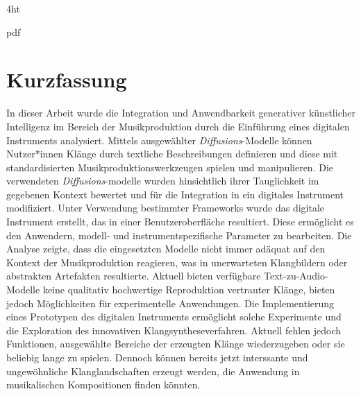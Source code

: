 \documentclass[
  a4paper,  %
  twoside,  %
  bibliography=totoc,
  headsepline,
  cleardoublepage=empty,
  parskip=half,
  draft=false
]{scrbook}
\begin{document}
\iftex4ht
  \Configure{$}{\PicMath}{\EndPicMath}{}

  {pdf}
  {%
  }
\fi



\Coverpage
\Copyright
\pagestyle{preamble}
\renewcommand*{\chapterpagestyle}{preamble}



\section*{Kurzfassung}

In dieser Arbeit wurde die Integration und Anwendbarkeit generativer künstlicher Intelligenz im Bereich der Musikproduktion durch die Einführung eines digitalen Instruments analysiert. Mittels ausgewählter \emph{Diffusions}-Modelle können Nutzer*innen Klänge durch textliche Beschreibungen definieren und diese mit standardisierten Musikproduktionswerkzeugen spielen und manipulieren. Die verwendeten \emph{Diffusions}-modelle wurden hinsichtlich ihrer Tauglichkeit im gegebenen Kontext bewertet und für die Integration in ein digitales Instrument modifiziert. Unter Verwendung bestimmter Frameworks wurde das digitale Instrument erstellt, das in einer Benutzeroberfläche resultiert. Diese ermöglicht es den Anwendern, modell- und instrumentspezifische Parameter zu bearbeiten. Die Analyse zeigte, dass die eingesetzten Modelle nicht immer adäquat auf den Kontext der Musikproduktion reagieren, was in unerwarteten Klangbildern oder abstrakten Artefakten resultierte. Aktuell bieten verfügbare Text-zu-Audio-Modelle keine qualitativ hochwertige Reproduktion vertrauter Klänge, bieten jedoch Möglichkeiten für experimentelle Anwendungen. Die Implementierung eines Prototypen des digitalen Instruments ermöglicht solche Experimente und die Exploration des innovativen Klangsyntheseverfahren. Aktuell fehlen jedoch Funktionen, ausgewählte Bereiche der erzeugten Klänge wiederzugeben oder sie beliebig lange zu spielen. Dennoch können bereits jetzt interssante und ungewöhnliche Klanglandschaften erzeugt werden, die Anwendung in musikalischen Kompositionen finden könnten. 
\end{document}
